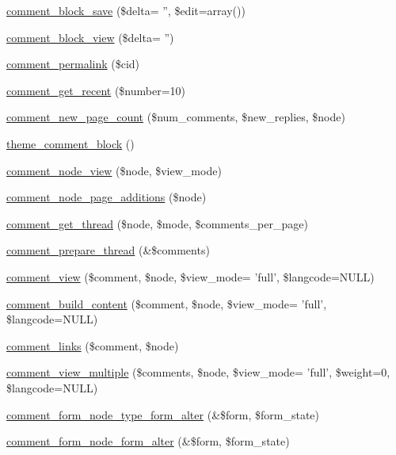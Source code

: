 \begin{DoxyCompactItemize}
\hyperlink{comment_8module_a565b5b4ebd9bb223e1e51ea00716b904}{comment\_\-block\_\-save} (\$delta= '', \$edit=array())
\item 
\hyperlink{comment_8module_a2087016cf9189eaf4d5563a08ce6a3ac}{comment\_\-block\_\-view} (\$delta= '')
\item 
\hyperlink{comment_8module_a2d3e88d7b6cb088dcc526dbb88fd9460}{comment\_\-permalink} (\$cid)
\item 
\hyperlink{comment_8module_aee855cbdc8d4b528e4d54817039fc760}{comment\_\-get\_\-recent} (\$number=10)
\item 
\hyperlink{comment_8module_a96371e6a82f797cdd2241ba5af50b590}{comment\_\-new\_\-page\_\-count} (\$num\_\-comments, \$new\_\-replies, \$node)
\item 
\hyperlink{group__themeable_gaa980a6cc6eeb012e7255fe0351a332ba}{theme\_\-comment\_\-block} ()
\item 
\hyperlink{comment_8module_af67cef07b57f84e54b8b26c38fe0fda0}{comment\_\-node\_\-view} (\$node, \$view\_\-mode)
\item 
\hyperlink{comment_8module_a6244e5c333fc28d69fd0283dd62935bc}{comment\_\-node\_\-page\_\-additions} (\$node)
\item 
\hyperlink{comment_8module_a7a7849475c35ea0266611552e0feba9c}{comment\_\-get\_\-thread} (\$node, \$mode, \$comments\_\-per\_\-page)
\item 
\hyperlink{comment_8module_a8fca2690aec83615ca65cb9f7f3b9438}{comment\_\-prepare\_\-thread} (\&\$comments)
\item 
\hyperlink{comment_8module_a68dd73af772c948e0f8a6cb144bef2cf}{comment\_\-view} (\$comment, \$node, \$view\_\-mode= 'full', \$langcode=NULL)
\item 
\hyperlink{comment_8module_a1ce48571361156189d7ce6f90c9465f8}{comment\_\-build\_\-content} (\$comment, \$node, \$view\_\-mode= 'full', \$langcode=NULL)
\item 
\hyperlink{comment_8module_a35585b785d03763c2ecc3f0cda6c0cf9}{comment\_\-links} (\$comment, \$node)
\item 
\hyperlink{comment_8module_add3fefcb6c60f8785d2c11cd49994681}{comment\_\-view\_\-multiple} (\$comments, \$node, \$view\_\-mode= 'full', \$weight=0, \$langcode=NULL)
\item 
\hyperlink{comment_8module_a81daa60b30cc06df7a8d08d075eb77eb}{comment\_\-form\_\-node\_\-type\_\-form\_\-alter} (\&\$form, \$form\_\-state)
\item 
\hyperlink{comment_8module_ab319853b494144007980b7e728ea09f2}{comment\_\-form\_\-node\_\-form\_\-alter} (\&\$form, \$form\_\-state)

\end{DoxyCompactItemize}
